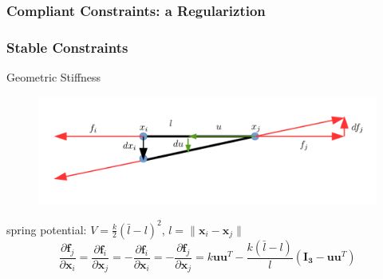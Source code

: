 \documentclass[serif,mathserif]{beamer}
\newcommand{\BOLD}[1]{\mathbf{#1}}
\newcommand{\PDIF}[2]{\frac{\partial #1}{\partial #2}}
\begin{document}
\begin{frame}
 \frametitle{Compliant Constraints: a Regulariztion}
\end{frame}

\begin{frame}
 \frametitle{Stable Constraints}
 Geometric Stiffness
 \begin{figure}[h]
  \centering
  \includegraphics[scale=0.2]{img/geo_stiff.png}
 \end{figure}
 spring potential: $V=\frac{k}{2}(\bar{l}-l)^2$, $l=\|\BOLD{x}_i-\BOLD{x}_j\|$ 
 \begin{equation*}
  \PDIF{\BOLD{f}_j}{\BOLD{x}_i}=\PDIF{\BOLD{f}_i}{\BOLD{x}_j}=-\PDIF{\BOLD{f}_i}{\BOLD{x}_i}=-\PDIF{\BOLD{f}_j}{\BOLD{x}_j}=k\BOLD{uu}^T-\frac{k(\bar l-l)}{l}(\BOLD{I_3}-\BOLD{uu}^T)
 \end{equation*}
\end{frame}



\begin{frame} 
\end{frame}
\end{document}
